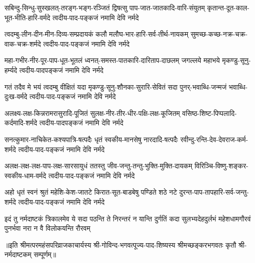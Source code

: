 
\fourlineindentedshloka
{सबिन्दु-सिन्धु-सुस्खलत्-तरङ्ग-भङ्ग-रञ्जितं}
{द्विषत्सु पाप-जात-जातकादि-वारि-संयुतम्}
{कृतान्त-दूत-काल-भूत-भीति-हारि-वर्मदे}
{त्वदीय-पाद-पङ्कजं नमामि देवि नर्मदे} %

\fourlineindentedshloka
{त्वदम्बु-लीन-दीन-मीन-दिव्य-सम्प्रदायकं}
{कलौ मलौघ-भार-हारि-सर्व-तीर्थ-नायकम्}
{सुमच्छ-कच्छ-नक्र-चक्र-वाक-चक्र-शर्मदे}
{त्वदीय-पाद-पङ्कजं नमामि देवि नर्मदे} %

\fourlineindentedshloka
{महा-गभीर-नीर-पूर-पाप-धूत-भूतलं}
{ध्वनत्-समस्त-पातकारि-दारिताप-दाछलम्}
{जगल्लये महाभये मृकण्डु-सूनु-हर्म्यदे}
{त्वदीय-पादपङ्कजं नमामि देवि नर्मदे} %

\fourlineindentedshloka
{गतं तदैव मे भयं त्वदम्बु वीक्षितं यदा}
{मृकण्डु-सूनु-शौनका-सुरारि-सेवितं सदा}
{पुनर्-भवाब्धि-जन्मजं भवाब्धि-दुःख-वर्मदे}
{त्वदीय-पाद-पङ्कजं नमामि देवि नर्मदे} %

\fourlineindentedshloka
{अलक्ष्य-लक्ष-किन्नरामरासुरादि-पूजितं}
{सुलक्ष-नीर-तीर-धीर-पक्षि-लक्ष-कूजितम्}
{वसिष्ठ-शिष्ट-पिप्पलादि-कर्दमादि-शर्मदे}
{त्वदीय-पादपङ्कजं नमामि देवि नर्मदे} %

\fourlineindentedshloka
{सनत्कुमार-नाचिकेत-कश्यपात्रि-षत्पदैः}
{धृतं स्वकीय-मानसेषु नारदादि-षत्पदैः}
{रवीन्दु-रन्ति-देव-देवराज-कर्म-शर्मदे}
{त्वदीय-पाद-पङ्कजं नमामि देवि नर्मदे} %

\fourlineindentedshloka
{अलक्ष-लक्ष-लक्ष-पाप-लक्ष-सारसायुधं}
{ततस्तु जीव-जन्तु-तन्तु-भुक्ति-मुक्ति-दायकम्}
{विरिञ्चि-विष्णु-शङ्कर-स्वकीय-धाम-वर्मदे}
{त्वदीय-पाद-पङ्कजं नमामि देवि नर्मदे} %

\fourlineindentedshloka
{अहो धृतं स्वनं श्रुतं महेशि-केश-जातटे}
{किरात-सूत-बाडबेषु पण्डिते शठे नटे}
{दुरन्त-पाप-तापहारि-सर्व-जन्तु-शर्मदे}
{त्वदीय-पाद-पङ्कजं नमामि देवि नर्मदे} %

\fourlineindentedshloka
{इदं तु नर्मदाष्टकं त्रिकालमेव ये सदा}
{पठन्ति ते निरन्तरं न यान्ति दुर्गतिं कदा}
{सुलभ्यदेहदुर्लभं महेशधामगौरवं}
{पुनर्भवा नरा न वै विलोकयन्ति रौरवम्} %

॥इति श्रीमत्परमहंसपरिव्राजकाचार्यस्य श्री-गोविन्द-भगवत्पूज्य-पाद-शिष्यस्य
श्रीमच्छङ्करभगवतः कृतौ श्री-नर्मदाष्टकम् सम्पूर्णम्॥